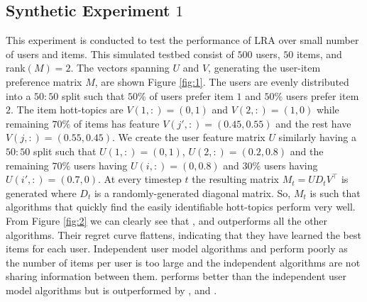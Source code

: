 


\subsection{Synthetic Experiment $1$}
This experiment is conducted to test the performance of LRA over small number of users and items. This simulated testbed consist of $500$ users, $50$ items, and rank$(M) = 2$. The vectors spanning $U$ and $V$, generating the user-item preference matrix $M$, are shown Figure \ref{fig:1}. The users are evenly distributed into a $50:50$ split such that $50\%$ of users prefer item $1$ and $50\%$ users prefer item  $2$. The item hott-topics are $V(1,:) = (0,1)$ and $V(2,:) = (1, 0)$ while remaining $70\%$ of items has feature $V(j',:) = (0.45, 0.55)$ and the rest have $V(j,:) = (0.55, 0.45)$. We create the user feature matrix $U$ similarly having a $50:50$ split such that $U(1,:) = (0,1)$, $U(2,:) = (0.2,0.8)$ and the remaining $70\%$ users having $U(i,:) = (0,0.8)$ and $30\%$ users having $U(i',:) = (0.7,0)$. At every timestep $t$ the resulting matrix $M_t =UD_tV^{\intercal}$ is generated where $D_t$ is a randomly-generated diagonal matrix. So, $M_t$ is  such that algorithms that quickly find the easily identifiable hott-topics perform very well. From Figure \ref{fig:2} we can clearly see that \LRAEXP , \LRATS and \LRAUCB outperforms all the other algorithms. Their regret curve flattens, indicating that they have learned the best items for each user. Independent user model algorithms \RBAUCB and \RBAEXP  perform poorly as the number of items per user is too large and the independent algorithms are not sharing information between them. \NMFBan performs better than the independent user model algorithms but is outperformed by \LRAEXP , \LRATS and \LRAUCB.


